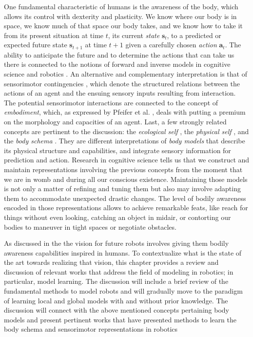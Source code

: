 One fundamental characteristic of humans is the awareness of the body, which allows its control with dexterity and plasticity. We know where our body is in space, we know much of that space our body takes, and we know how to take it from its present situation at time $t$, its current \textit{state} $\bm{s}_t$, to a predicted or expected future state $\bm{s}_{t+1}$ at time $t+1$ given a carefully chosen \textit{action} $\bm{a}_t$. The ability to anticipate the future and to determine the actions that can take us there is connected to the notions of forward and inverse models in cognitive science and robotics \cite{Kawato1999Internalmodelsmotor,Pierella2019dynamicsmotorlearning,NguyenTuong2011Modellearningrobot}. An alternative and complementary interpretation is that of sensorimotor contingencies \cite{Maye2013Extendingsensorimotorcontingency,Jacquey2019Sensorimotorcontingenciesas,Buhrmann2013dynamicalsystemsaccount}, which denote the structured relations between the actions of an agent and the ensuing sensory inputs resulting from interaction. The potential sensorimotor interactions are connected to the concept of \textit{embodiment}, which, as expressed by Pfeifer et al. \cite{Pfeifer2006Howbodyshapes}, deals with  putting a premium on the morphology and capacities of an agent. Last, a few strongly related concepts are pertinent to the discussion: the \textit{ecological self} , the \textit{physical self} , and the \textit{body schema} . They are different interpretations of \textit{body models} that describe its physical structure and capabilities, and integrate sensory information for prediction and action. Research in cognitive science tells us that we construct and maintain representations involving the previous concepts from the moment that we are in womb and during all our conscious existence. Maintaining those models is not only a matter of refining and tuning them but also may involve adapting them to accommodate unexpected drastic changes. The level of bodily awareness encoded in those representations allows to achieve remarkable feats, like reach for things without even looking, catching an object in midair, or contorting our bodies to maneuver in tight spaces or negotiate obstacles.

As discussed in the  the vision for future robots involves giving them bodily awareness capabilities inspired in humans. To contextualize what is the state of the art towards realizing that vision, this chapter provides a review and discussion of relevant works that address the field of modeling in robotics; in particular, model learning. The discussion will include a brief review of the fundamental methods to model robots and will gradually move to the paradigm of learning local and global models with and without prior knowledge. The discussion will connect with the above mentioned concepts pertaining body models and present pertinent works that have presented methods to learn the body schema and sensorimotor representations in robotics


